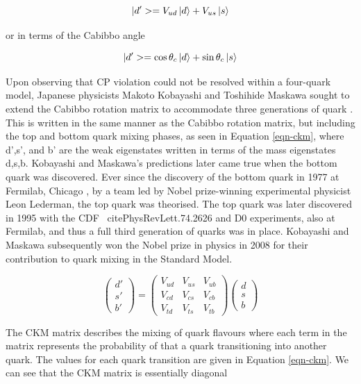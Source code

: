 \begin{equation}
|d'> = V_{ud}\ket{d} + V_{us}\ket{s}
\end{equation}

or in terms of the Cabibbo angle 

\begin{equation}
|d'> = \cos\theta_c\ket{d} + \sin\theta_c\ket{s}
\end{equation}

Upon observing that CP violation could not be resolved within a four-quark model, Japanese physicists Makoto Kobayashi and Toshihide Maskawa 
sought to extend the Cabibbo rotation matrix to accommodate three generations of quark \cite{Kobayashi:1973fv}. This is written in the same 
manner as the Cabibbo rotation matrix, but including the top and bottom quark mixing phases, as seen in Equation \ref{eqn-ckm}, where d',s', 
and b' are the weak eigenstates written in terms of the mass eigenstates d,s,b. Kobayashi and Maskawa's predictions later came true when the 
bottom quark was discovered. Ever since the discovery of the bottom quark in 1977 at Fermilab, Chicago \cite{Innes:1977ae}, by a team led by 
Nobel prize-winning experimental physicist Leon Lederman, the top quark was theorised. The top quark was later discovered in 1995 with the CDF \
cite{PhysRevLett.74.2626} and D0 \cite{PhysRevLett.74.2422} experiments, also at Fermilab, and thus a full third generation of quarks was in 
place. Kobayashi and Maskawa subsequently won the Nobel prize in physics in 2008 for their contribution to quark mixing in the Standard 
Model.   

\begin{equation} \label{equ-CKM}
\begin{pmatrix}
d' \\
s' \\
b' 
\end{pmatrix}
=
\begin{pmatrix}
V_{ud} & V_{us} & V_{ub} \\
V_{cd} & V_{cs} & V_{cb} \\
V_{td} & V_{ts} & V_{tb} 
\end{pmatrix}
\begin{pmatrix}
d \\
s \\
b 
\end{pmatrix}
\end{equation}

The CKM matrix describes the mixing of quark flavours where each term in the matrix represents the probability of that a quark transitioning 
into another quark. The values for each quark transition are given in Equation \ref{eqn-ckm}. We can see that the CKM matrix is essentially 
diagonal %

